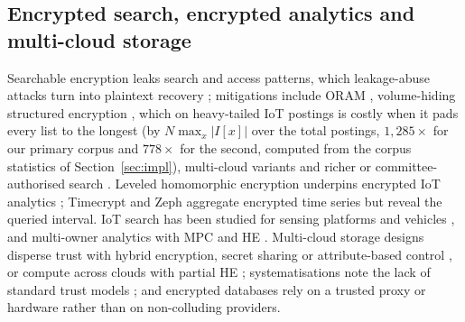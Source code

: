 \documentclass[a4paper,fleqn]{cas-sc}
\begin{document}
\subsection{Encrypted search, encrypted analytics and multi-cloud storage}
Searchable encryption leaks search and access patterns, which leakage-abuse
attacks turn into plaintext recovery
\citep{islam2012access,cash2015leakage,grubbs2017leakage}; mitigations include
ORAM \citep{goldreich1996software}, volume-hiding structured encryption
\citep{kamara2019computationally,patel2019mitigating}, which on heavy-tailed
IoT postings is costly when it pads every list to the longest (by
$N\max_x|I[x]|$ over the total postings, $1{,}285\times$ for our primary corpus
and $778\times$ for the second, computed from the corpus statistics of
Section~\ref{sec:impl}), multi-cloud variants
\citep{xu2021privacy,xu2023symmetric} and richer or committee-authorised
search \citep{zhang2024secure,yang2023dynamic,du2022lightweight}. Leveled
homomorphic encryption \citep{fan2012somewhat,cryptoeprint:2016/421} underpins
encrypted IoT analytics \citep{halder2022enabling,kamble2024homomorphic};
Timecrypt \citep{timecrypt} and Zeph \citep{zeph} aggregate encrypted time
series but reveal the queried interval. IoT search has been studied for sensing
platforms \citep{xu2019achieving} and vehicles \citep{wu2024distributed}, and
multi-owner analytics with MPC and HE \citep{verma2025secure}. Multi-cloud
storage designs disperse trust with hybrid encryption, secret sharing or
attribute-based control \citep{bharot2025cloudlock,muthuvel2026design}, or
compute across clouds with partial HE \citep{wang2020shamc}; systematisations
note the lack of standard trust models \citep{cryptoeprint:2026/207}; and
encrypted databases \citep{poddar2019arx,crooks2018obladi,dauterman2021snoopy}
rely on a trusted proxy or hardware rather than on non-colluding providers.
\end{document}
